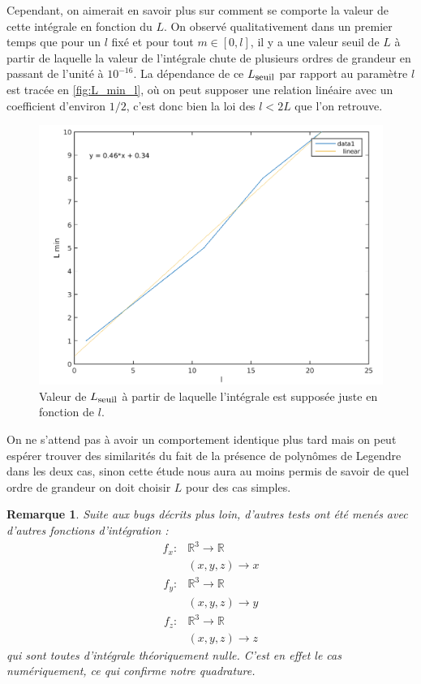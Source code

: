 \documentclass[11pt]{article}
\newtheorem{rmq}{Remarque}
\newcommand{\smbox}[1]{\mbox{\footnotesize #1}}
\newcommand{\R}{\mathbb{R}}
\begin{document}
Cependant, on aimerait en savoir plus sur comment se comporte la valeur de cette intégrale en fonction du $L$. On observé qualitativement dans
un premier temps que pour un $l$ fixé et pour tout $m\in[0,l]$, il y a une valeur seuil de
$L$ à partir de laquelle la valeur de l'intégrale chute de plusieurs ordres de grandeur en passant de l'unité à $10^{-16}$. La dépendance
de ce $L_{\smbox{seuil}}$ par rapport au paramètre $l$ est tracée en \autoref{fig:L_min_l}, o\`u on peut supposer une relation
linéaire avec un coefficient d'environ $1/2$, c'est donc bien la loi des $l<2L$ que l'on retrouve. 
\begin{figure}
  \centering
  \includegraphics[height=0.4\textheight]{L_min_l}
  \caption{Valeur de $L_{\smbox{seuil}}$  à partir de laquelle l'intégrale est supposée juste en fonction de $l$.}
  \label{fig:L_min_l}
\end{figure}

On ne s'attend pas à avoir un comportement identique plus tard mais on peut espérer trouver des similarités du fait de la présence de
polynômes de Legendre dans les deux cas, sinon cette étude nous aura au moins permis de savoir de quel ordre de grandeur on doit choisir $L$
pour des cas simples.

\begin{rmq}
  Suite aux bugs décrits plus loin, d'autres tests ont été menés avec d'autres fonctions d'intégration :
  \begin{align*}
    f_x : &\R^3 \to \R \\
          &(x, y, z) \to x
  \end{align*}
  \begin{align*}
    f_y : &\R^3 \to \R \\
          &(x, y, z) \to y
  \end{align*}                   
  \begin{align*}
    f_z : &\R^3 \to \R \\
          &(x, y, z) \to z
  \end{align*}
  qui sont toutes d'intégrale théoriquement nulle. C'est en effet le cas numériquement, ce qui confirme notre quadrature. 
\end{rmq}
\end{document}
